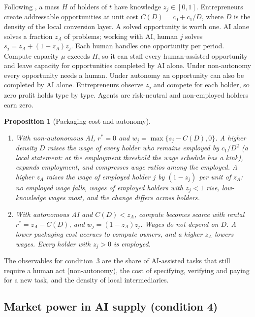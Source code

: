 \documentclass[12pt]{article}
\newtheorem{proposition}{Proposition}
\theoremstyle{remark}
\begin{document}
Following \citet{garicano2026comment}, a mass $H$ of holders of $t$ have knowledge $z_j\in[0,1]$. Entrepreneurs create addressable opportunities at unit cost $C(D)=c_0+c_1/D$, where $D$ is the density of the local conversion layer. A solved opportunity is worth one. AI alone solves a fraction $z_A$ of problems; working with AI, human $j$ solves $s_j=z_A+(1-z_A)z_j$. Each human handles one opportunity per period. Compute capacity $\mu$ exceeds $H$, so it can staff every human-assisted opportunity and leave capacity for opportunities completed by AI alone. Under non-autonomy every opportunity needs a human. Under autonomy an opportunity can also be completed by AI alone. Entrepreneurs observe $z_j$ and compete for each holder, so zero profit holds type by type. Agents are risk-neutral and non-employed holders earn zero.

\begin{proposition}[Packaging cost and autonomy]\label{prop:autonomy}
\begin{enumerate}[label=(\roman*),itemsep=0pt]
\item With non-autonomous AI, $r^*=0$ and $w_j=\max\{s_j-C(D),0\}$. A higher density $D$ raises the wage of every holder who remains employed by $c_1/D^2$ (a local statement: at the employment threshold the wage schedule has a kink), expands employment, and compresses wage ratios among the employed. A higher $z_A$ raises the wage of employed holder $j$ by $(1-z_j)$ per unit of $z_A$: no employed wage falls, wages of employed holders with $z_j<1$ rise, low-knowledge wages most, and the change differs across holders.
\item With autonomous AI and $C(D)<z_A$, compute becomes scarce with rental $r^*=z_A-C(D)$, and $w_j=(1-z_A)z_j$. Wages do not depend on $D$. A lower packaging cost accrues to compute owners, and a higher $z_A$ lowers wages. Every holder with $z_j>0$ is employed.
\end{enumerate}
\end{proposition}

The observables for condition~3 are the share of AI-assisted tasks that still require a human act (non-autonomy), the cost of specifying, verifying and paying for a new task, and the density of local intermediaries.

\subsection{Market power in AI supply (condition 4)}\label{sec:market}
\end{document}

